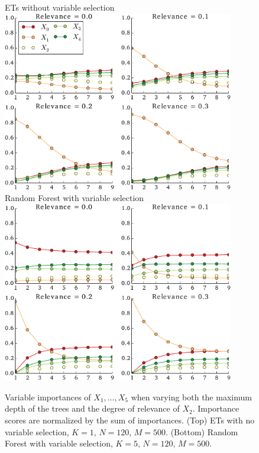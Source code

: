 \begin{figure}
\centering
ETs without variable selection\\[1ex]
\includegraphics[width=0.9\textwidth]{figures/ch7_bias_depth.pdf}\\[2ex]
Random Forest with variable selection\\[1ex]
\includegraphics[width=0.9\textwidth]{figures/ch7_bias_depth_rf.pdf}
\caption{Variable importances of $X_1, \dots, X_5$ when varying both the
         maximum depth of the trees and the degree of relevance of $X_2$.
         Importance scores are normalized by the sum of importances.
         (Top) ETs with no variable selection, $K=1$, $N=120$, $M=500$.
         (Bottom) Random Forest with variable selection, $K=5$, $N=120$, $M=500$.}
\label{fig:7:bias:depth}
\end{figure}

